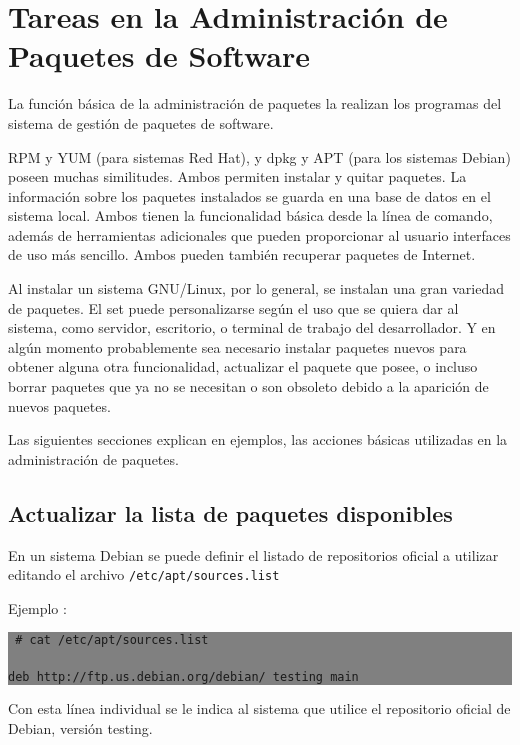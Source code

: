 \documentclass[12pt]{article}
\begin{document}
\section*{Tareas en la Administración de Paquetes de Software}

La función básica de la administración de paquetes la realizan los programas del sistema
de gestión de paquetes de software. 

RPM y YUM (para sistemas Red Hat), y dpkg y APT (para los sistemas Debian) poseen muchas similitudes. 
Ambos permiten instalar y quitar paquetes. La información sobre los paquetes instalados se guarda en una base de datos en el sistema local. Ambos tienen la funcionalidad básica desde la línea de comando, además de herramientas adicionales que pueden proporcionar al usuario interfaces de uso más sencillo. Ambos pueden también recuperar paquetes de Internet.

Al instalar un sistema GNU/Linux, por lo general, se instalan una gran variedad de paquetes. 
El set puede personalizarse según el uso que se quiera dar al sistema, como servidor, escritorio, o terminal de trabajo del desarrollador. 
Y en algún momento probablemente sea necesario instalar paquetes nuevos para obtener alguna otra funcionalidad, actualizar el paquete que posee, o incluso borrar paquetes que ya no se necesitan o son obsoleto debido a la aparición de nuevos paquetes. 

Las siguientes secciones explican en ejemplos, las acciones básicas utilizadas en la administración
de paquetes.

\subsection*{Actualizar la lista de paquetes disponibles}

En un sistema Debian se puede definir el listado de repositorios oficial a utilizar  editando el archivo {\tt /etc/apt/sources.list}

Ejemplo :

\colorbox{grey}{\parbox[t]{0.95\linewidth}{ \vspace*{0.5cm} {\tt
\# cat /etc/apt/sources.list \\
 \\
deb http://ftp.us.debian.org/debian/ testing main \\
 } \vspace*{0.5cm} } } 

Con esta línea individual se le indica al sistema que utilice el repositorio oficial de Debian, versión testing.
\end{document}
